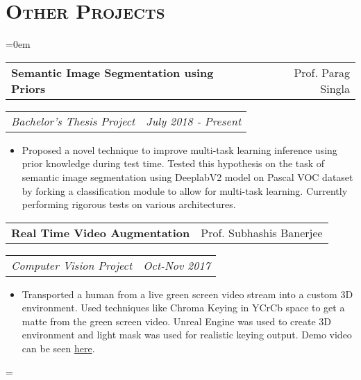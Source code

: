\documentclass{article}
\makeatletter
\newenvironment{longversion}{}{} %
\newenvironment{absolutelynopagebreak}
  {\par\nobreak\vfil\penalty0\vfilneg
   \vtop\bgroup}
  {\par\xdef\tpd{\the\prevdepth}\egroup
   \prevdepth=\tpd}
\newcommand{\headerrow}[2]
{\begin{tabular*}{\linewidth}{l@{\extracolsep{\fill}}r}
    #1 &
    #2 \\
\end{tabular*}}
\newcommand{\tmpsection}[1]{}
\let\tmpsection=\section
\renewcommand{\section}[1]{\tmpsection*{\textsc{#1}}}
\makeatother
\begin{document}
\begin{absolutelynopagebreak}
\begin{longversion}
\section{Other Projects}
\begin{list} {}{\leftmargin=0em}
\setlength{\leftmargin}{0pt}

\item[]
\headerrow {\textbf{Semantic Image Segmentation using Priors}}{Prof. Parag Singla}
\headerrow {\emph{Bachelor's Thesis Project}}{\emph{July 2018 - Present}}
\begin{itemize} \item[] 
Proposed a novel technique to improve multi-task learning inference using prior knowledge during test time. Tested this hypothesis on the task of semantic image segmentation using DeeplabV2 model on Pascal VOC dataset by forking a classification module to allow for multi-task learning. Currently performing rigorous tests on various architectures.
\end{itemize}

\item[]
\headerrow {\textbf{Real Time Video Augmentation}}{Prof. Subhashis Banerjee}
\headerrow {\emph{Computer Vision Project}}{\emph{Oct-Nov 2017}}
\begin{itemize} \item[]
    Transported a human from a live green screen video stream into a custom 3D environment. Used techniques like Chroma Keying in YCrCb space to get a matte from the green screen video. Unreal Engine was used to create 3D environment and light mask was used for realistic keying output. Demo video can be seen \href{https://github.com/ozym4nd145/Vision_Project/blob/master/demo_video/shashank_result.avi?raw=true}{here}.
\end{itemize}


\end{list}
\end{longversion}
\end{absolutelynopagebreak}
\end{document}
